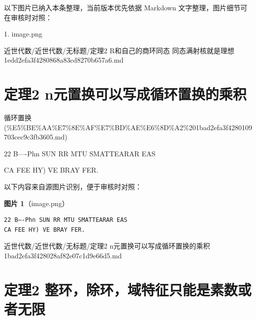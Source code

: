 \begin{note}[关联图片]
以下图片已纳入本条整理，当前版本优先依据 Markdown 文字整理，图片细节可在审核时对照：

1. image.png\\

\end{note}

\begin{note}[来源路径]

近世代数/近世代数/无标题/定理2 R和自己的商环同态 同态满射核就是理想 1edd2efa3f4280868a83cd8270b657a6.md

\end{note}

\section*{定理2 n元置换可以写成循环置换的乘积}

\begin{note}[来源上级主题]

循环置换  (\%E5\%BE\%AA\%E7\%8E\%AF\%E7\%BD\%AE\%E6\%8D\%A2\%201bad2efa3f4280109703cec9c3fb3605.md)

\end{note}

\begin{theorem}[定理2 n元置换可以写成循环置换的乘积]

22 B—-Phn SUN RR MTU SMATTEARAR EAS

CA FEE HY) VE BRAY FER.

\end{theorem}

\begin{note}
以下内容来自源图片识别，便于审核时对照：

\textbf{图片 1}（image.png）
\begin{Verbatim}[fontsize=\small]
22 B—-Phn SUN RR MTU SMATTEARAR EAS
CA FEE HY) VE BRAY FER.
\end{Verbatim}

\end{note}

\begin{note}[来源路径]

近世代数/近世代数/无标题/定理2 n元置换可以写成循环置换的乘积 1bad2efa3f428028af82e07c1d9e66d5.md

\end{note}

\section*{定理2 整环，除环，域特征只能是素数或者无限}

